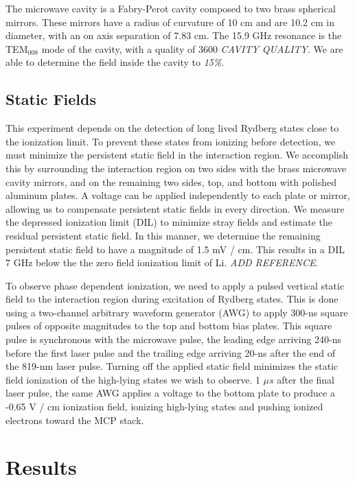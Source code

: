 \documentclass[aps,pra,preprint,groupedaddress]{revtex4-1}
\begin{document}
The microwave cavity is a Fabry-Perot cavity composed to two brass spherical mirrors. These mirrors have a radius of curvature of 10 cm and are 10.2 cm in diameter, with an on axis separation of 7.83 cm. The 15.9 GHz resonance is the TEM$_{008}$ mode of the cavity, with a quality of 3600 \emph{CAVITY QUALITY}. We are able to determine the field inside the cavity to \emph{15\%}.

\subsection{\label{fields} Static Fields}

This experiment depends on the detection of long lived Rydberg states close to the ionization limit. To prevent these states from ionizing before detection, we must minimize the persistent static field in the interaction region. We accomplish this by surrounding the interaction region on two sides with the brass microwave cavity mirrors, and on the remaining two sides, top, and bottom with polished aluminum plates. A voltage can be applied independently to each plate or mirror, allowing us to compensate persistent static fields in every direction. We measure the depressed ionization limit (DIL) to minimize stray fields and estimate the residual persistent static field. In this manner, we determine the remaining persistent static field to have a magnitude of 1.5 mV / cm. This results in a DIL 7 GHz below the the zero field ionization limit of Li. \emph{ADD REFERENCE}.

To observe phase dependent ionization, we need to apply a pulsed vertical static field to the interaction region during excitation of Rydberg states. This is done using a two-channel arbitrary waveform generator (AWG) to apply 300-ns square pulses of opposite magnitudes to the top and bottom bias plates. This square pulse is synchronous with the microwave pulse, the leading edge arriving 240-ns before the first laser pulse and the trailing edge arriving 20-ns after the end of the 819-nm laser pulse. Turning off the applied static field minimizes the static field ionization of the high-lying states we wish to observe. 1 $\mu s$ after the final laser pulse, the same AWG applies a voltage to the bottom plate to produce a -0.65 V / cm ionization field, ionizing high-lying states and pushing ionized electrons toward the MCP stack.

\section{\label{results}Results}
\end{document}
